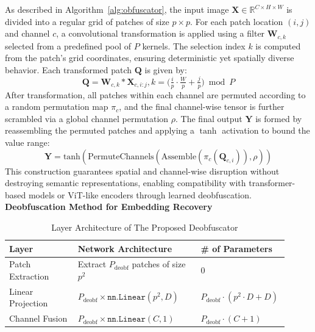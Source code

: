 \documentclass{ieeeaccess}
\begin{document}
As described in Algorithm~\ref{alg:obfuscator}, the input image $\mathbf{X} \in \mathbb{R}^{C \times H \times W}$ is divided into a regular grid of patches of size $p \times p$. For each patch location $(i,j)$ and channel $c$, a convolutional transformation is applied using a filter $\mathbf{W}_{c,k}$ selected from a predefined pool of $P$ kernels. The selection index $k$ is computed from the patch's grid coordinates, ensuring deterministic yet spatially diverse behavior. Each transformed patch $\mathbf{Q}$ is given by:
\begin{equation}
    \mathbf{Q} = \mathbf{W}_{c,k}\ast\mathbf{X}_{c,i:j},k = \bigl(\tfrac{i}{p}\cdot\tfrac{W}{p}+\tfrac{j}{p}\bigr)\bmod P
\end{equation}
After transformation, all patches within each channel are permuted according to a random permutation map $\pi_c$, and the final channel-wise tensor is further scrambled via a global channel permutation $\rho$. The final output $\mathbf{Y}$ is formed by reassembling the permuted patches and applying a $\tanh$ activation to bound the value range:
\begin{equation}
    \mathbf{Y} = \text{tanh}(\text{PermuteChannels}(\text{Assemble}(\pi_c(\mathbf{Q}_{c,i})), \rho))
\end{equation}
This construction guarantees spatial and channel-wise disruption without destroying semantic representations, enabling compatibility with transformer-based models or ViT-like encoders through learned deobfuscation. \\

\noindent\textbf{Deobfuscation Method for Embedding Recovery}

\begin{table}[t]
\centering
\caption{Layer Architecture of The Proposed Deobfuscator}
\label{tab:deobf-symbolic}
\begin{tabular}{p{0.24\linewidth} p{0.43\linewidth} p{0.24\linewidth}}
\toprule
\textbf{Layer} & \textbf{Network Architecture} & \textbf{\# of Parameters} \\
\midrule
Patch Extraction &
Extract $P_{\text{deobf}}$ patches of size $p^2$ &
$0$ \\

Linear Projection &
$P_{\text{deobf}} \times \texttt{nn.Linear}(p^2, D)$ &
$P_{\text{deobf}} \cdot (p^2 \cdot D + D)$ \\

Channel Fusion &
$P_{\text{deobf}} \times \texttt{nn.Linear}(C, 1)$ &
$P_{\text{deobf}} \cdot (C + 1)$ \\
\bottomrule
\end{tabular}
\end{table}
\end{document}
